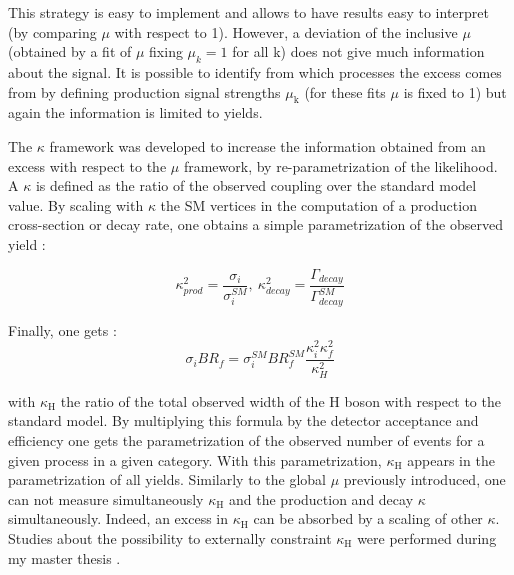 \begin{enumerate}
This strategy is easy to implement and allows to have results easy to interpret (by comparing $\mu$ with respect to 1).
However, a deviation of the inclusive $\mu$ (obtained by a fit of $\mu$ fixing $\mu_k=1$ for all k) does not give much information about the signal.
It is possible to identify from which processes the excess comes from by defining production signal strengths \(\mu_{\text{k}}\) (for these fits $\mu$ is fixed to 1) but again the information is limited to yields.

The \(\kappa\) framework \cite{LHCHXSWG-2012-001} was developed to increase the information obtained from an excess with respect to the $\mu$ framework, by re-parametrization of the likelihood.
A \(\kappa\) is defined as the ratio of the observed coupling over the standard model value.
By scaling with \(\kappa\) the SM vertices in the computation of a production cross-section or decay rate, one obtains a simple parametrization of the observed yield :

\begin{equation}
\kappa_{prod}^2 = \frac{\sigma_i}{\sigma_{i}^{SM}},\ \kappa_{decay}^2 = \frac{\Gamma_{decay}}{\Gamma_{decay}^{SM}}
\end{equation}

Finally, one gets :
\begin{equation}
\sigma_i BR_f = \sigma_i^{SM}  BR_f^{SM} \frac{\kappa_i^2\kappa_f^2}{\kappa_H^2}
\end{equation}

with \(\kappa_{\text{H}}\) the ratio of the total observed width of the H boson with respect to the standard model.
By multiplying this formula by the detector acceptance and efficiency one gets the parametrization of the observed number of events for a given process in a given category.
With this parametrization, \(\kappa_{\text{H}}\) appears in the parametrization of all yields.
Similarly to the global $\mu$ previously introduced, one can not measure simultaneously \(\kappa_{\text{H}}\) and the production and decay \(\kappa\) simultaneously.
Indeed, an excess in \(\kappa_{\text{H}}\) can be absorbed by a scaling of other \(\kappa\).
Studies about the possibility to externally constraint \(\kappa_{\text{H}}\) were performed during my master thesis \cite{Goudet_NPAC, Goudet_141105, Goudet_141113, Goudet_140731}.


\end{enumerate}
